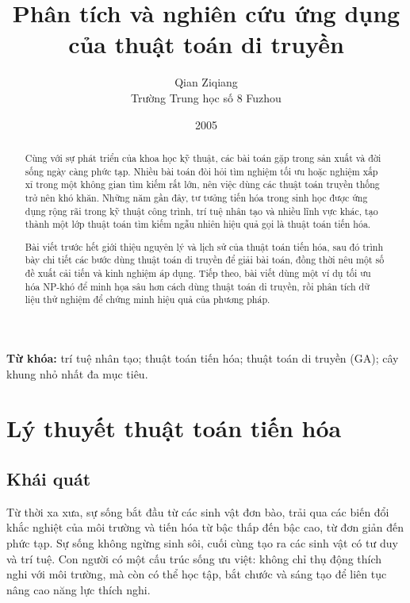 \documentclass[11pt]{article}
\title{Phân tích và nghiên cứu ứng dụng của thuật toán di truyền}
\author{Qian Ziqiang\\Trường Trung học số 8 Fuzhou}
\date{2005}
\newcommand{\GA}{\ensuremath{\mathrm{GA}}}
\begin{document}
\maketitle


\renewcommand{\abstractname}{Tóm tắt}
\begin{abstract}
Cùng với sự phát triển của khoa học kỹ thuật, các bài toán gặp trong sản
xuất và đời sống ngày càng phức tạp. Nhiều bài toán đòi hỏi tìm nghiệm tối ưu
hoặc nghiệm xấp xỉ trong một không gian tìm kiếm rất lớn, nên việc dùng các
thuật toán truyền thống trở nên khó khăn. Những năm gần đây, tư tưởng tiến hóa
trong sinh học được ứng dụng rộng rãi trong kỹ thuật công trình, trí tuệ nhân
tạo và nhiều lĩnh vực khác, tạo thành một lớp thuật toán tìm kiếm ngẫu nhiên
hiệu quả gọi là thuật toán tiến hóa.

Bài viết trước hết giới thiệu nguyên lý và lịch sử của thuật toán tiến hóa,
sau đó trình bày chi tiết các bước dùng thuật toán di truyền để giải bài toán,
đồng thời nêu một số đề xuất cải tiến và kinh nghiệm áp dụng. Tiếp theo, bài
viết dùng một ví dụ tối ưu hóa NP-khó để minh họa sâu hơn cách dùng thuật toán
di truyền, rồi phân tích dữ liệu thử nghiệm để chứng minh hiệu quả của phương
pháp.
\end{abstract}

\noindent\textbf{Từ khóa:} trí tuệ nhân tạo; thuật toán tiến hóa; thuật toán
di truyền (\GA); cây khung nhỏ nhất đa mục tiêu.

\section{Lý thuyết thuật toán tiến hóa}

\subsection{Khái quát}

Từ thời xa xưa, sự sống bắt đầu từ các sinh vật đơn bào, trải qua các biến đổi
khắc nghiệt của môi trường và tiến hóa từ bậc thấp đến bậc cao, từ đơn giản
đến phức tạp. Sự sống không ngừng sinh sôi, cuối cùng tạo ra các sinh vật có
tư duy và trí tuệ. Con người có một cấu trúc sống ưu việt: không chỉ thụ động
thích nghi với môi trường, mà còn có thể học tập, bắt chước và sáng tạo để
liên tục nâng cao năng lực thích nghi.
\end{document}
